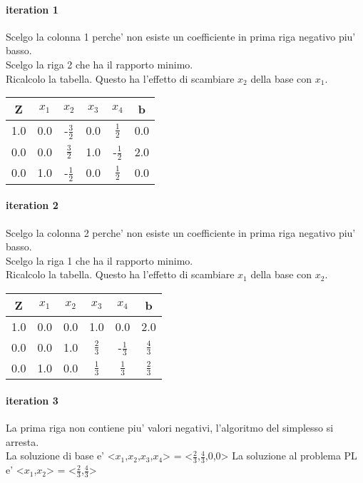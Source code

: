 \paragraph{iteration 1}
Scelgo la colonna 1 perche' non esiste un coefficiente in prima riga negativo piu' basso. \\
Scelgo la riga 2 che ha il rapporto minimo. \\
Ricalcolo la tabella.
Questo ha l'effetto di scambiare $x_2$ della base con $x_1$. \
\begin{center}
	\begin{tabular}{|c|c|c|c|c|c|}
		\hline
		Z & $x_1$ & $x_2$ & $x_3$ & $x_4$ & b\\
		\hline
		1.0 & 0.0 & -$\frac 3 2$ & 0.0 & $\frac 1 2$ & 0.0\\
		0.0 & 0.0 & $\frac 3 2$ & 1.0 & -$\frac 1 2$ & 2.0\\
		0.0 & 1.0 & -$\frac 1 2$ & 0.0 & $\frac 1 2$ & 0.0\\
		\hline
	\end{tabular}
\end{center}
\paragraph{iteration 2}
Scelgo la colonna 2 perche' non esiste un coefficiente in prima riga negativo piu' basso. \\
Scelgo la riga 1 che ha il rapporto minimo. \\
Ricalcolo la tabella.
Questo ha l'effetto di scambiare $x_1$ della base con $x_2$. \
\begin{center}
	\begin{tabular}{|c|c|c|c|c|c|}
		\hline
		Z & $x_1$ & $x_2$ & $x_3$ & $x_4$ & b\\
		\hline
		1.0 & 0.0 & 0.0 & 1.0 & 0.0 & 2.0\\
		0.0 & 0.0 & 1.0 & $\frac 2 3$ & -$\frac 1 3$ & $\frac 4 3$\\
		0.0 & 1.0 & 0.0 & $\frac 1 3$ & $\frac 1 3$ & $\frac 2 3$\\
		\hline
	\end{tabular}
\end{center}
\paragraph{iteration 3}
La prima riga non contiene piu' valori negativi, l'algoritmo del simplesso si arresta. \\
La soluzione di base e' <$x_1$,$x_2$,$x_3$,$x_4$> = <$\frac 2 3$,$\frac 4 3$,0,0>\*
La soluzione al problema PL e' <$x_1$,$x_2$> = <$\frac 2 3$,$\frac 4 3$>\*
